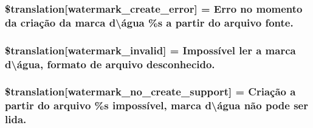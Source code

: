 \subsubsection[{\$translation}]{\setlength{\rightskip}{0pt plus 5cm}\$translation\mbox{[}\textquotesingle{}watermark\+\_\+create\+\_\+error\textquotesingle{}\mbox{]} = \textquotesingle{}Erro no momento da criação da marca d\textbackslash{}\textquotesingle{}água \%s a partir do arquivo fonte.\textquotesingle{}}\label{class_8upload_8pt___b_r_8php_aabca0b65dadbc6184415c16375f284ca}
\hypertarget{class_8upload_8pt___b_r_8php_ac336e7a5701e47ba4a05e9e498a3cc44}{}
\subsubsection[{\$translation}]{\setlength{\rightskip}{0pt plus 5cm}\$translation\mbox{[}\textquotesingle{}watermark\+\_\+invalid\textquotesingle{}\mbox{]} = \textquotesingle{}Impossível ler a marca d\textbackslash{}\textquotesingle{}água, formato de arquivo desconhecido.\textquotesingle{}}\label{class_8upload_8pt___b_r_8php_ac336e7a5701e47ba4a05e9e498a3cc44}
\hypertarget{class_8upload_8pt___b_r_8php_a82d5853430ab72dc1f9799ec36144cc6}{}
\subsubsection[{\$translation}]{\setlength{\rightskip}{0pt plus 5cm}\$translation\mbox{[}\textquotesingle{}watermark\+\_\+no\+\_\+create\+\_\+support\textquotesingle{}\mbox{]} = \textquotesingle{}Criação a partir do arquivo \%s impossível, marca d\textbackslash{}\textquotesingle{}água não pode ser lida.\textquotesingle{}}\label{class_8upload_8pt___b_r_8php_a82d5853430ab72dc1f9799ec36144cc6}
